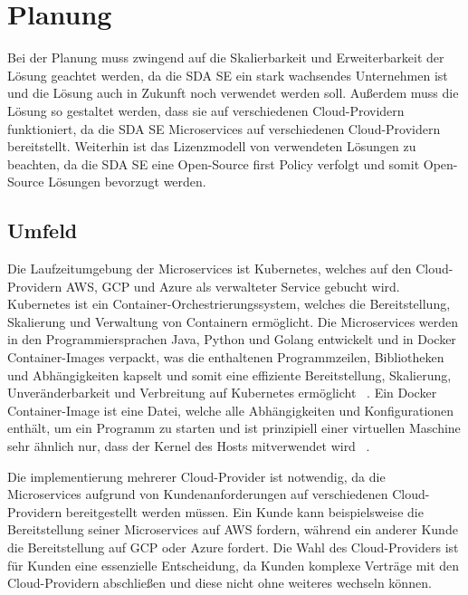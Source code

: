 \section{Planung}
\label{sec:description:planung}
Bei der Planung muss zwingend auf die Skalierbarkeit und Erweiterbarkeit der Lösung geachtet werden, da die SDA SE ein stark wachsendes Unternehmen ist und die Lösung auch in Zukunft noch verwendet werden soll.
Außerdem muss die Lösung so gestaltet werden, dass sie auf verschiedenen Cloud-Providern funktioniert, da die SDA SE Microservices auf verschiedenen Cloud-Providern bereitstellt.
Weiterhin ist das Lizenzmodell von verwendeten Lösungen zu beachten, da die SDA SE eine Open-Source first Policy verfolgt und somit Open-Source Lösungen bevorzugt werden.

\subsection{Umfeld}
\label{subsec:description:umfeld}
Die Laufzeitumgebung der Microservices ist Kubernetes, welches auf den Cloud-Providern \ac{AWS}, \ac{GCP} und \ac{Azure} als verwalteter Service gebucht wird.
Kubernetes ist ein Container-Orchestrierungssystem, welches die Bereitstellung, Skalierung und Verwaltung von Containern ermöglicht.
Die Microservices werden in den Programmiersprachen Java, Python und Golang entwickelt und in Docker Container-Images verpackt, was die enthaltenen Programmzeilen, Bibliotheken und Abhängigkeiten kapselt und somit eine effiziente Bereitstellung, Skalierung, Unveränderbarkeit und Verbreitung auf Kubernetes ermöglicht ~\cite{rad2017introduction}.
Ein Docker Container-Image ist eine Datei, welche alle Abhängigkeiten und Konfigurationen enthält, um ein Programm zu starten und ist prinzipiell einer virtuellen Maschine sehr ähnlich nur, dass der Kernel des Hosts mitverwendet wird ~\cite[p.~229]{rad2017introduction}.
\medskip

Die implementierung mehrerer Cloud-Provider ist notwendig, da die Microservices aufgrund von Kundenanforderungen auf verschiedenen Cloud-Providern bereitgestellt werden müssen.
Ein Kunde kann beispielsweise die Bereitstellung seiner Microservices auf AWS fordern, während ein anderer Kunde die Bereitstellung auf GCP oder Azure fordert.
Die Wahl des Cloud-Providers ist für Kunden eine essenzielle Entscheidung, da Kunden komplexe Verträge mit den Cloud-Providern abschließen und diese nicht ohne weiteres wechseln können.
\medskip

